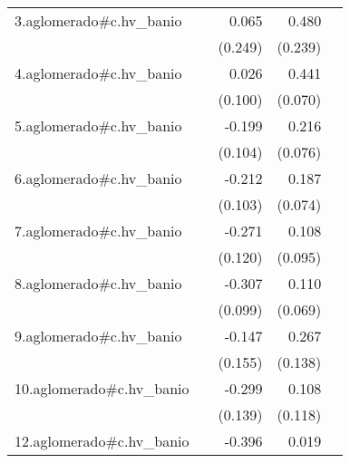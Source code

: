 {\begin{longtable}{l*{4}{D{.}{.}{-1}}}
\addlinespace
3.aglomerado#c.hv\_banio&                     &       0.065         &       0.480\sym{*}  &                     \\
            &                     &     (0.249)         &     (0.239)         &                     \\
\addlinespace
4.aglomerado#c.hv\_banio&                     &       0.026         &       0.441\sym{***}&                     \\
            &                     &     (0.100)         &     (0.070)         &                     \\
\addlinespace
5.aglomerado#c.hv\_banio&                     &      -0.199         &       0.216\sym{**} &                     \\
            &                     &     (0.104)         &     (0.076)         &                     \\
\addlinespace
6.aglomerado#c.hv\_banio&                     &      -0.212\sym{*}  &       0.187\sym{*}  &                     \\
            &                     &     (0.103)         &     (0.074)         &                     \\
\addlinespace
7.aglomerado#c.hv\_banio&                     &      -0.271\sym{*}  &       0.108         &                     \\
            &                     &     (0.120)         &     (0.095)         &                     \\
\addlinespace
8.aglomerado#c.hv\_banio&                     &      -0.307\sym{**} &       0.110         &                     \\
            &                     &     (0.099)         &     (0.069)         &                     \\
\addlinespace
9.aglomerado#c.hv\_banio&                     &      -0.147         &       0.267         &                     \\
            &                     &     (0.155)         &     (0.138)         &                     \\
\addlinespace
10.aglomerado#c.hv\_banio&                     &      -0.299\sym{*}  &       0.108         &                     \\
            &                     &     (0.139)         &     (0.118)         &                     \\
\addlinespace
12.aglomerado#c.hv\_banio&                     &      -0.396\sym{**} &       0.019         &                     \\

\end{longtable}}
